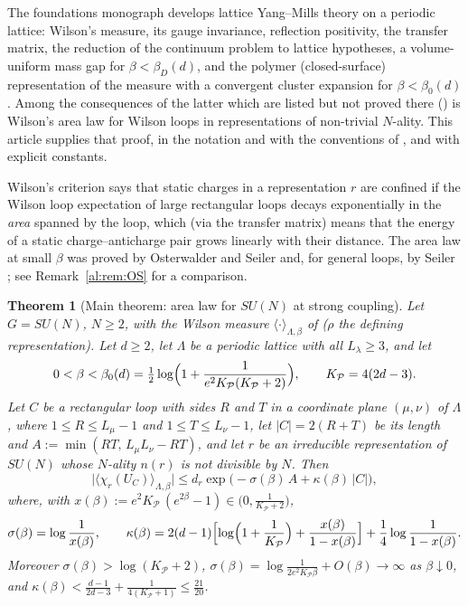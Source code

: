 \documentclass[11pt,a4paper]{article}
\newtheorem{theorem}{Theorem}[section]
\theoremstyle{definition}
\theoremstyle{remark}
\newcommand{\cP}{\mathcal{P}}
\newcommand{\Fref}[3]{\cite[#1~`#2' (\texttt{#3})]{F}}
\begin{document}
The foundations monograph \cite{F} develops lattice Yang--Mills theory on a periodic lattice: Wilson's measure, its
gauge invariance, reflection positivity, the transfer matrix, the reduction of the continuum problem to lattice
hypotheses, a volume-uniform mass gap for $\beta<\beta_D(d)$, and the polymer (closed-surface) representation of the
measure with a convergent cluster expansion for $\beta<\beta_0(d)$. Among the consequences of the latter which are
listed but not proved there (\Fref{Remark}{Further consequences, not proved here}{rem:further}) is Wilson's area law
for Wilson loops in representations of non-trivial $N$-ality. This article supplies that proof, in the notation and
with the conventions of \cite{F}, and with explicit constants.

Wilson's criterion \cite{Wil74} says that static charges in a representation $r$ are confined if the Wilson loop
expectation of large rectangular loops decays exponentially in the \emph{area} spanned by the loop, which (via the
transfer matrix) means that the energy of a static charge--anticharge pair grows linearly with their distance. The
area law at small $\beta$ was proved by Osterwalder and Seiler \cite{OS78} and, for general loops, by Seiler
\cite{Sei82}; see Remark~\ref{al:rem:OS} for a comparison.

\begin{theorem}[Main theorem: area law for $SU(N)$ at strong coupling]\label{al:thm:intro}
Let $G=SU(N)$, $N\ge2$, with the Wilson measure $\langle\cdot\rangle_{\Lambda,\beta}$ of
\Fref{Definition}{Wilson measure}{def:wilson} ($\rho$ the defining representation). Let $d\ge2$, let $\Lambda$ be a
periodic lattice with all $L_\lambda\ge3$, and let
\[
0<\beta<\beta_0(d)=\tfrac12\log\Bigl(1+\frac1{e^2K_\cP(K_\cP+2)}\Bigr),\qquad K_\cP=4(2d-3).
\]
Let $C$ be a rectangular loop with sides $R$ and $T$ in a coordinate plane $(\mu,\nu)$ of $\Lambda$, where
$1\le R\le L_\mu-1$ and $1\le T\le L_\nu-1$, let $|C|=2(R+T)$ be its length and $A:=\min(RT,\,L_\mu L_\nu-RT)$, and let
$r$ be an irreducible representation of $SU(N)$ whose $N$-ality $n(r)$ is not divisible by $N$. Then
\begin{equation}\label{al:eq:main}
\bigl|\langle\chi_r(U_C)\rangle_{\Lambda,\beta}\bigr|\le d_r\exp\bigl(-\sigma(\beta)\,A+\kappa(\beta)\,|C|\bigr),
\end{equation}
where, with $x(\beta):=e^2K_\cP\,(e^{2\beta}-1)\in\bigl(0,\frac1{K_\cP+2}\bigr)$,
\begin{equation}\label{al:eq:constants-intro}
\sigma(\beta)=\log\frac1{x(\beta)},\qquad
\kappa(\beta)=2(d-1)\Bigl[\log\Bigl(1+\frac1{K_\cP}\Bigr)+\frac{x(\beta)}{1-x(\beta)}\Bigr]+\frac14\log\frac1{1-x(\beta)} .
\end{equation}
Moreover $\sigma(\beta)>\log(K_\cP+2)$, $\sigma(\beta)=\log\frac1{2e^2K_\cP\beta}+O(\beta)\to\infty$ as
$\beta\downarrow0$, and $\kappa(\beta)<\frac{d-1}{2d-3}+\frac1{4(K_\cP+1)}\le\frac{21}{20}$.
\end{theorem}
\end{document}
